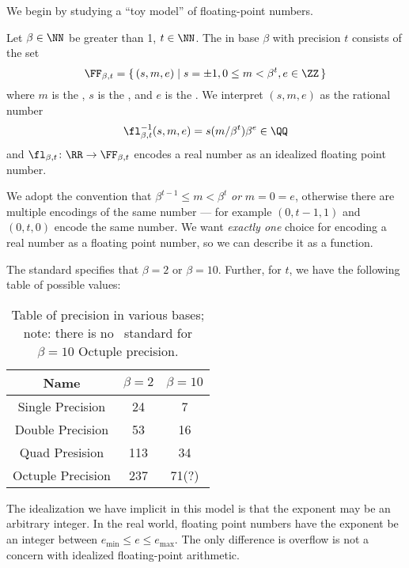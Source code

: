 We begin by studying a ``toy model'' of floating-point numbers.

\begin{defn}
  Let $\beta\in\NN$ be greater than 1, $t\in\NN$. The
   in base $\beta$ with precision $t$
  consists of the set
  \begin{equation}
    \FF_{\beta,t} = \{\, (s,m,e)\mid s=\pm1, 0\leq m<\beta^{t},e\in\ZZ\,\}
  \end{equation}
  where $m$ is the , $s$ is the , and $e$ is the
  . We interpret $(s,m,e)$ as the rational number
  \begin{equation}
    \fl^{-1}_{\beta,t}(s,m,e) = s(m/\beta^{t})\beta^{e}\in\QQ
  \end{equation}
  and $\fl_{\beta,t}\colon\RR\to\FF_{\beta,t}$ encodes a real number as an
  idealized floating point number.
\end{defn}

\begin{rmk}
We adopt the convention that $\beta^{t-1}\leq m<\beta^{t}$ \emph{or} $m=0=e$, otherwise there are
multiple encodings of the same number --- for example $(0,t-1,1)$ and
$(0,t,0)$ encode the same number. We want \emph{exactly one} choice for
encoding a real number as a floating point number, so we can describe it
as a function.
\end{rmk}

\begin{rmk}
  The  standard specifies that $\beta=2$ or $\beta=10$. Further,
  for $t$, we have the following table of possible values:
\begin{table}[h!]
  \centering
  \begin{tabular}{ |c|c|c| }
    \hline
 Name              & $\beta=2$ & $\beta=10$ \\ \hline
 Single Precision  & 24  & 7 \\  
 Double Precision  & 53  & 16\\
 Quad Presision    & 113 & 34\\
 Octuple Precision & 237 & 71(?)\\
 \hline
\end{tabular}
\caption{Table of precision in various bases; note: there is no
  \ieee\ standard for $\beta=10$ Octuple precision.}
\end{table}
\end{rmk}

\begin{rmk}[On ``Idealization'']
  The idealization we have implicit in this model is that the exponent
  may be an arbitrary integer. In the real world, floating point numbers
  have the exponent be an integer between $e_{\text{min}}\leq e\leq e_{\text{max}}$.
  The only difference is overflow is not a concern with idealized
  floating-point arithmetic.
\end{rmk}

